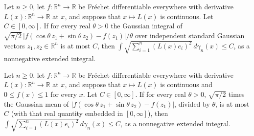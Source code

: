 \begin{lemma}
\leanok
{}
Let $n\ge 0$, let $f:\mathbb R^n\to\mathbb R$ be Fréchet differentiable everywhere with
derivative $L(x):\mathbb R^n\to\mathbb R$ at $x$, and suppose that $x\mapsto L(x)$ is
continuous. Let $C\in[0,\infty]$. If for every real $\theta>0$ the Gaussian integral of
$\sqrt{\pi/2}\,|f(\cos\theta\,z_1+\sin\theta\,z_2)-f(z_1)|/\theta$ over independent
standard Gaussian vectors $z_1,z_2\in\mathbb R^n$ is at most $C$, then $\int
\sqrt{\sum_{i=1}^n (L(x)e_i)^2}\,d\gamma_n(x)\le C$, as a nonnegative extended integral.
\end{lemma}

\begin{lemma}
\leanok
{}
Let $n\ge 0$, let $f:\mathbb R^n\to\mathbb R$ be Fréchet differentiable everywhere with
derivative $L(x):\mathbb R^n\to\mathbb R$ at $x$, and suppose that $x\mapsto L(x)$ is
continuous and $0\le f(x)\le 1$ for every $x$. Let $C\in[0,\infty]$. If for every real
$\theta>0$, $\sqrt{\pi/2}$ times the Gaussian mean of
$|f(\cos\theta\,z_1+\sin\theta\,z_2)-f(z_1)|$, divided by $\theta$, is at most $C$ (with
that real quantity embedded in $[0,\infty]$), then $\int \sqrt{\sum_{i=1}^n
(L(x)e_i)^2}\,d\gamma_n(x)\le C$, as a nonnegative extended integral.
\end{lemma}
